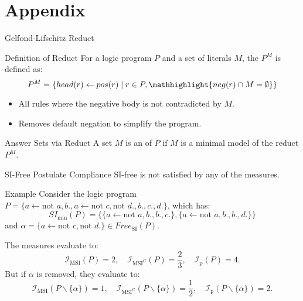 \section{Appendix}

\begin{frame}{Gelfond-Lifschitz Reduct}
    \begin{block}{Definition of Reduct}
        For a logic program \(P\) and a set of literals \(M\), the  \(P^M\) is defined as:
        \[
            P^M = \{head(r) \leftarrow pos(r) \mid r \in P, \mathhighlight{neg(r) \cap M = \emptyset}\}
        \]
        \begin{itemize}
            \item All rules where the negative body is not contradicted by \(M\).
            \item Removes default negation to simplify the program.
        \end{itemize}
    \end{block}
    \begin{block}{Answer Sets via Reduct}
        A set \(M\) is an  of \(P\) if \(M\) is a minimal model of the reduct \(P^M\).
    \end{block}
\end{frame}

\begin{frame}{SI-Free Postulate Compliance}
    SI-free is not satisfied by any of the measures.
    \begin{exampleblock}{Example}
        Consider the logic program \(P = \{a \leftarrow \text{not } a, b., a \leftarrow \text{not }c, \text{not }d., b., c., d.\}\), which has:
        \[
            SI_{\min}(P) = \{\{a \leftarrow \text{not }a, b., b., c.\}, \{a \leftarrow \text{not }a, b., b., d.\}\}
        \]
        and \(\alpha = \{a \leftarrow \text{not }c, \text{not }d.\} \in Free_{\text{SI}}(P)\).

        The measures evaluate to:
        \[
            \mathcal{I}_{\text{MSI}}(P) = 2,\quad \mathcal{I}_{\text{MSI}^\text{C}}(P) = \frac{2}{3},\quad \mathcal{I}_{\text{p}}(P) = 4.
        \]
        But if \(\alpha\) is removed, they evaluate to:
        \[
            \mathcal{I}_{\text{MSI}}(P \backslash \{\alpha\}) = 1,\quad \mathcal{I}_{\text{MSI}^\text{C}}(P \backslash \{\alpha\}) = \frac{1}{2},\quad \mathcal{I}_{\text{p}}(P \backslash \{\alpha\}) = 2.
        \]
    \end{exampleblock}
\end{frame}
